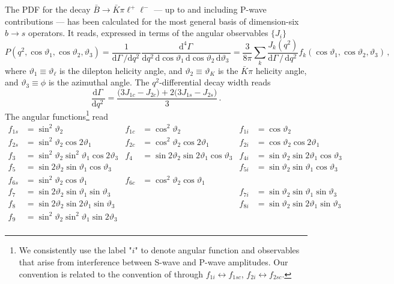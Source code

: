 \documentclass[aps,prd,reprint,nofootinbib,preprintnumbers]{revtex4}
\newcommand{\rmdx}[1]{\mbox{d} #1 \,} %
\renewcommand{\theta}{\vartheta}
\begin{document}
The PDF for the decay $\bar{B}\to\bar{K}\pi\ell^+\ell^-$ --- up to and including P-wave contributions --- has been calculated
for the most general basis of dimension-six $b\to s$ operators. It reads, expressed in terms of the angular observables $\lbrace J_i\rbrace$ \cite{Blake:2012mb,Bobeth:2012vn}
\begin{equation}
    P(q^2, \cos\theta_1, \cos\theta_2, \theta_3) = \frac{1}{\rmdx{\Gamma}/\rmdx{q^2}} \frac{\rmdx{^4\Gamma}}{\rmdx{q^2} \rmdx{\cos\theta_1} \rmdx{\cos\theta_2} \rmdx{\theta_3}} = \frac{3}{8\pi} \sum_k \frac{J_{k}(q^2)}{\rmdx{\Gamma} /\, \rmdx{q^2}} f_k(\cos\theta_1, \cos\theta_2, \theta_3)\,,
\end{equation}
where $\theta_1 \equiv \theta_\ell$ is the dilepton helicity angle, and $\theta_2 \equiv \theta_{K}$ is the $\bar{K}\pi$ helicity angle, and $\theta_3 \equiv \phi$ is the azimuthal angle.
The $q^2$-differential decay width reads
\begin{equation}
    \frac{\rmdx{\Gamma}}{\rmdx{q^2}} = \frac{\big(3 J_{1c} - J_{2c}\big) + 2\big(3J_{1s} - J_{2s}\big)}{3}\,.
\end{equation}
The angular functions\footnote{%
    We consistently use the label "$i$" to denote angular function and observables that arise
    from interference between S-wave and P-wave amplitudes. Our convention is related to the convention
    of \cite{Bobeth:2012vn} through $f_{1i} \leftrightarrow f_{1sc}$, $f_{2i} \leftrightarrow f_{2sc}$.
} read \cite{Blake:2012mb,Bobeth:2012vn}
\begin{equation}
\begin{aligned}
    f_{1s} & = \sin^2\theta_2 &
    f_{1c} & = \cos^2\theta_2 &
    f_{1i} & = \cos\theta_2\\
    f_{2s} & = \sin^2\theta_2 \cos 2\theta_1 &
    f_{2c} & = \cos^2\theta_2 \cos 2\theta_1 &
    f_{2i} & = \cos\theta_2 \cos 2\theta_1\\
    f_{3}  & = \sin^2\theta_2\sin^2\theta_1 \cos 2\theta_3 &
    f_{4}  & = \sin 2\theta_2 \sin 2\theta_1 \cos\theta_3 &
    f_{4i} & = \sin\theta_2 \sin 2\theta_1 \cos\theta_3\\
    f_{5}  & = \sin 2\theta_2 \sin \theta_1 \cos\theta_3 & & &
    f_{5i} & = \sin\theta_2 \sin \theta_1 \cos\theta_3\\
    f_{6s} & = \sin^2\theta_2 \cos\theta_1 &
    f_{6c} & = \cos^2\theta_2 \cos\theta_1\\
    f_{7}  & = \sin 2\theta_2 \sin \theta_1 \sin\theta_3 & & &
    f_{7i} & = \sin\theta_2 \sin \theta_1 \sin\theta_3\\
    f_{8}  & = \sin 2\theta_2 \sin 2\theta_1 \sin\theta_3 & & &
    f_{8i} & = \sin\theta_2 \sin 2\theta_1 \sin\theta_3\\
    f_{9}  & = \sin^2\theta_2\sin^2\theta_1 \sin 2\theta_3\\
\end{aligned}
\end{equation}
\end{document}

